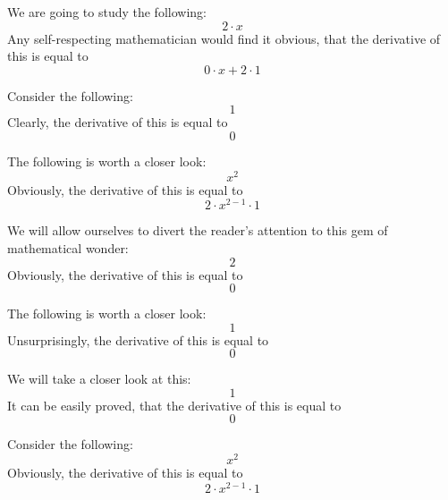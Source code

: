 \documentclass{article}
\begin{document}
We are going to study the following:
\begin{equation}
2 \cdot x 
\end{equation}
Any self-respecting mathematician would find it obvious, that the derivative of this is equal to
\begin{equation}
0 \cdot x + 2 \cdot 1 
\end{equation}

Consider the following:
\begin{equation}
1 
\end{equation}
Clearly, the derivative of this is equal to
\begin{equation}
0 
\end{equation}

The following is worth a closer look:
\begin{equation}
x ^{2 } 
\end{equation}
Obviously, the derivative of this is equal to
\begin{equation}
2 \cdot x ^{2 - 1 } \cdot 1 
\end{equation}

We will allow ourselves to divert the reader's attention to this gem of mathematical wonder:
\begin{equation}
2 
\end{equation}
Obviously, the derivative of this is equal to
\begin{equation}
0 
\end{equation}

The following is worth a closer look:
\begin{equation}
1 
\end{equation}
Unsurprisingly, the derivative of this is equal to
\begin{equation}
0 
\end{equation}

We will take a closer look at this:
\begin{equation}
1 
\end{equation}
It can be easily proved, that the derivative of this is equal to
\begin{equation}
0 
\end{equation}

Consider the following:
\begin{equation}
x ^{2 } 
\end{equation}
Obviously, the derivative of this is equal to
\begin{equation}
2 \cdot x ^{2 - 1 } \cdot 1 
\end{equation}
\end{document}
